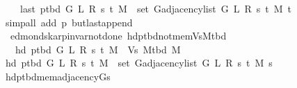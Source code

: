 \begin{isabellebody}
\ \ \ \ {\isachardoublequoteopen}last\ {\isacharparenleft}{\kern0pt}p{\isacharunderscore}{\kern0pt}tbd\ G\ L\ R\ s\ t\ M{\isacharparenright}{\kern0pt}\ {\isasymin}\ set\ {\isacharparenleft}{\kern0pt}G{\isachardot}{\kern0pt}adjacency{\isacharunderscore}{\kern0pt}list\ {\isacharparenleft}{\kern0pt}G{}\ L\ R\ s\ t\ M{\isacharparenright}{\kern0pt}\ t{\isacharparenright}{\kern0pt}{\isachardoublequoteclose}\isanewline
\ \ \ \ \isamarkupfalse%
\ {\isacharparenleft}{\kern0pt}simp{\isacharunderscore}{\kern0pt}all\ add{\isacharcolon}{\kern0pt}\ p\ butlast{\isacharunderscore}{\kern0pt}append{\isacharparenright}{\kern0pt}\isanewline
{}\isamarkupfalse%
%
\endisatagproof
{\isafoldproof}%
%
\isadelimproof
\isanewline
%
\endisadelimproof
%
\isadeliminvisible
\isanewline
%
\endisadeliminvisible
%
\isataginvisible
{}\isamarkupfalse%
\ {\isacharparenleft}{\kern0pt}\ edmonds{\isacharunderscore}{\kern0pt}karp{\isacharunderscore}{\kern0pt}invar{\isacharunderscore}{\kern0pt}not{\isacharunderscore}{\kern0pt}done{\isacharunderscore}{\kern0pt}{}{\isacharparenright}{\kern0pt}\ hd{\isacharunderscore}{\kern0pt}p{\isacharunderscore}{\kern0pt}tbd{\isacharunderscore}{\kern0pt}not{\isacharunderscore}{\kern0pt}mem{\isacharunderscore}{\kern0pt}Vs{\isacharunderscore}{\kern0pt}M{\isacharunderscore}{\kern0pt}tbd{\isacharcolon}{\kern0pt}\isanewline
\ \ \ {\isachardoublequoteopen}hd\ {\isacharparenleft}{\kern0pt}p{\isacharunderscore}{\kern0pt}tbd\ G\ L\ R\ s\ t\ M{\isacharparenright}{\kern0pt}\ {\isasymnotin}\ Vs\ {\isacharparenleft}{\kern0pt}M{\isacharunderscore}{\kern0pt}tbd\ M{\isacharparenright}{\kern0pt}{\isachardoublequoteclose}%
\endisataginvisible
{\isafoldinvisible}%
%
\isadeliminvisible
\isanewline
%
\endisadeliminvisible
%
\isadelimproof
%
\endisadelimproof
%
\isatagproof
{}\isamarkupfalse%
\ {\isacharminus}{\kern0pt}\isanewline
\ \ \isamarkupfalse%
\ {\isachardoublequoteopen}hd\ {\isacharparenleft}{\kern0pt}p{\isacharunderscore}{\kern0pt}tbd\ G\ L\ R\ s\ t\ M{\isacharparenright}{\kern0pt}\ {\isasymin}\ set\ {\isacharparenleft}{\kern0pt}G{\isachardot}{\kern0pt}adjacency{\isacharunderscore}{\kern0pt}list\ {\isacharparenleft}{\kern0pt}G{}\ L\ R\ s\ t\ M{\isacharparenright}{\kern0pt}\ s{\isacharparenright}{\kern0pt}{\isachardoublequoteclose}\isanewline
\ \ \ \ \isamarkupfalse%
\ hd{\isacharunderscore}{\kern0pt}p{\isacharunderscore}{\kern0pt}tbd{\isacharunderscore}{\kern0pt}mem{\isacharunderscore}{\kern0pt}adjacency{\isacharunderscore}{\kern0pt}G{}{\isacharunderscore}{\kern0pt}s\isanewline

\end{isabellebody}

